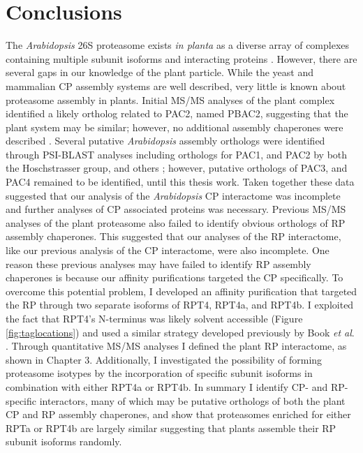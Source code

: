 \section{Conclusions}
The \textit{Arabidopsis} 26S proteasome exists \textit{in planta} as a diverse array of complexes containing multiple subunit isoforms and interacting proteins \citep{book10, fu99, yang04}. However, there are several gaps in our knowledge of the plant particle.  While the yeast and mammalian CP assembly systems are well described, very little is known about proteasome assembly in plants. Initial MS/MS analyses of the plant complex identified a likely ortholog related to PAC2, named PBAC2, suggesting that the plant system may be similar; however, no additional assembly chaperones were described \citep{book10}. Several putative \textit{Arabidopsis} assembly orthologs were identified through PSI-BLAST analyses including orthologs for PAC1, and PAC2 by both the Hoschstrasser group, and others \citep{kusmierczyk11, le07}; however, putative orthologs of PAC3, and PAC4 remained to be identified, until this thesis work. Taken together these data suggested that our analysis of the \textit{Arabidopsis} CP interactome was incomplete and further analyses of CP associated proteins was necessary.
Previous MS/MS analyses of the plant proteasome also failed to identify obvious orthologs of RP assembly chaperones. This suggested that our analyses of the RP interactome, like our previous analysis of the CP interactome, were also incomplete. One reason these previous analyses may have failed to identify RP assembly chaperones is because our affinity purifications targeted the CP specifically. To overcome this potential problem, I developed an affinity purification that targeted the RP through two separate isoforms of RPT4, RPT4a, and RPT4b. I exploited the fact that RPT4's N-terminus was likely solvent accessible (Figure \ref{fig:taglocations}) and used a similar strategy developed previously by Book \textit{et al}. \citep{book10}. Through quantitative MS/MS analyses I defined the plant RP interactome, as shown in Chapter 3. Additionally, I investigated the possibility of forming proteasome isotypes by the incorporation of specific subunit isoforms in combination with either RPT4a or RPT4b.  In summary I identify CP- and RP-specific interactors, many of which may be putative orthologs of both the plant CP and RP assembly chaperones, and show that proteasomes enriched for either RPTa or RPT4b are largely similar suggesting that plants assemble their RP subunit isoforms randomly.

